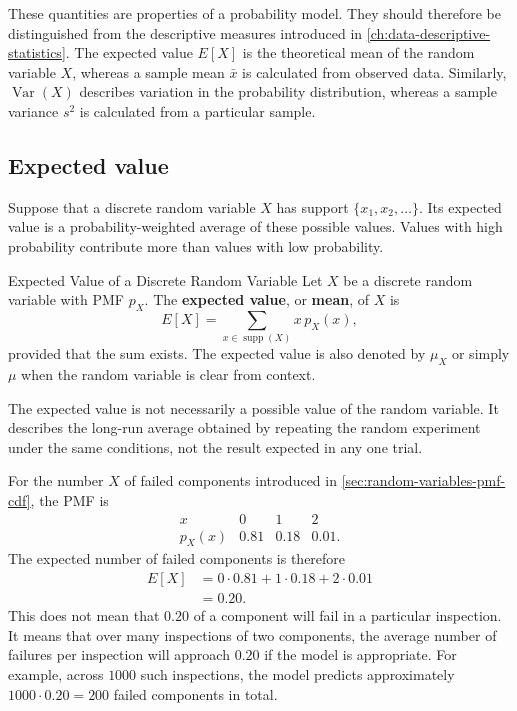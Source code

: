 These quantities are properties of a probability model. They should therefore be distinguished from the descriptive measures introduced in \autoref{ch:data-descriptive-statistics}. The expected value $E[X]$ is the theoretical mean of the random variable $X$, whereas a sample mean $\bar{x}$ is calculated from observed data. Similarly, $\operatorname{Var}(X)$ describes variation in the probability distribution, whereas a sample variance $s^2$ is calculated from a particular sample.

\subsection{Expected value}

Suppose that a discrete random variable $X$ has support $\{x_1,x_2,\ldots\}$. Its expected value is a probability-weighted average of these possible values. Values with high probability contribute more than values with low probability.

\begin{definition}{Expected Value of a Discrete Random Variable}
    Let $X$ be a discrete random variable with PMF $p_X$. The \textbf{expected value}, or \textbf{mean}, of $X$ is
    \[
    E[X]=\sum_{x\in\operatorname{supp}(X)}x\,p_X(x),
    \]
    provided that the sum exists. The expected value is also denoted by $\mu_X$ or simply $\mu$ when the random variable is clear from context.
\end{definition}

The expected value is not necessarily a possible value of the random variable. It describes the long-run average obtained by repeating the random experiment under the same conditions, not the result expected in any one trial.

\begin{example}\par
For the number $X$ of failed components introduced in \autoref{sec:random-variables-pmf-cdf}, the PMF is
\[
\begin{array}{c|ccc}
x & 0 & 1 & 2\\ \hline
p_X(x) & 0.81 & 0.18 & 0.01.
\end{array}
\]
The expected number of failed components is therefore
\[
\begin{aligned}
E[X]
&=0\cdot0.81+1\cdot0.18+2\cdot0.01\\
&=0.20.
\end{aligned}
\]
This does not mean that $0.20$ of a component will fail in a particular inspection. It means that over many inspections of two components, the average number of failures per inspection will approach $0.20$ if the model is appropriate. For example, across $1000$ such inspections, the model predicts approximately $1000\cdot0.20=200$ failed components in total.
\end{example}

